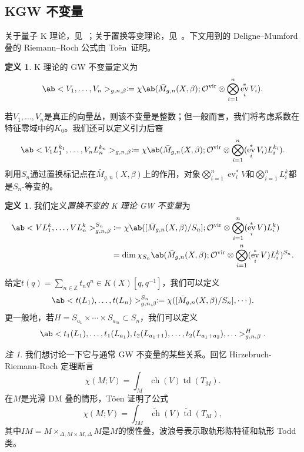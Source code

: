 \documentclass{amsart}
\theoremstyle{definition}
\newtheorem{defn}[thm]{定义}
\theoremstyle{remark}
\newtheorem{rmk}[thm]{注}
\theoremstyle{plain}
\theoremstyle{definition}
\theoremstyle{remark}
\newcommand{\Z}{\mathbb{Z}}
\newcommand{\mc}[1]{\mathcal{#1}}
\newcommand{\mr}[1]{\mathrm{#1}}
\newcommand{\on}[1]{\operatorname{#1}}
\newcommand{\wt}[1]{\widetilde{#1}}
\newcommand{\1}{\mathbf{1}}
\newcommand{\2}{\mathbf{2}}
\newcommand{\3}{\mathbf{3}}
\newcommand{\vir}{\mr{vir}}
\DeclareMathOperator{\ev}{ev}
\begin{document}
\subsection{KGW 不变量}%
\label{sub:KGW invariants}

关于量子 K 理论，见~\cite{Lee2004}；关于置换等变理论，见~\cite{Givental2017K1,GiventalK7}。下文用到的 Deligne--Mumford 叠的 Riemann--Roch 公式由 To\"en~\cite{Toen1999}证明。

\begin{defn}
    K 理论的 GW 不变量定义为
    \[ \ab<V_1, \ldots, V_n>_{g,n,\beta} \coloneqq \chi\ab(\bar{M}_{g,n}(X, \beta); \mc{O}^{\vir} \otimes \bigotimes_{i=1}^n \ev_i^* V_i). \]
\end{defn}

若\(V_1, \ldots, V_n\)是真正的向量丛，则该不变量是整数；但一般而言，我们将考虑系数在特征零域中的\(K_0\)。我们还可以定义引力后裔
\[ \ab<V_1 L_1^{k_1}, \ldots, V_n L_n^{k_n}>_{g,n,\beta} \coloneqq \chi\ab(\bar{M}_{g,n}(X, \beta); \mc{O}^{\vir} \otimes \bigotimes_{i=1}^n ( \ev_i^* V_i )L_i^{k_i} ). \]
利用\(S_n\)通过置换标记点在\(\bar{M}_{g,n}(X, \beta)\)上的作用，对象\(\bigotimes_{i=1}^n \ev_i^* V\)和\(\bigotimes_{i=1}^n L_i^k\)都是\(S_n\)-等变的。

\begin{defn}
    我们定义\textit{置换不变的 K 理论 GW 不变量}为
    \begin{align*}
        \ab<V L_1^k, \ldots, V L_n^k>_{g,n,\beta}^{S_n} &\coloneqq \chi\ab([ \bar{M}_{g,n}(X, \beta)/S_n ]; \mc{O}^{\vir} \otimes \bigotimes_{i=1}^n ( \ev_i^* V ) L_i^k) \\
        &= \dim \chi_{S_n} \ab(\bar{M}_{g,n}(X, \beta); \mc{O}^{\vir} \otimes \bigotimes_{i=1}^n ( \ev_i^* V ) L_i^k )^{S_n}.
    \end{align*}
\end{defn}

给定\(t(q) = \sum_{n \in \Z} t_n q^n \in K(X)[q,q^{-1}]\)，我们可以定义
\[ \ab< t(L_1), \ldots, t(L_n)>^{S_n}_{g,n,\beta} \coloneqq \chi ([\bar{M}_{g,n}(X,\beta)/S_n], \cdots). \]
更一般地，若\(H = S_{a_1} \times \cdots \times S_{a_m} \subset S_n\)，我们可以定义
\[ \ab<t_1(L_1), \ldots, t_1(L_{a_1}), t_2(L_{a_1+1}), \ldots, t_2(L_{a_1+a_2}), \ldots>_{g,n,\beta}^H. \]

\begin{rmk}
    我们想讨论一下它与通常 GW 不变量的某些关系。回忆 Hirzebruch-Riemann-Roch 定理断言
    \[ \chi(M; V) = \int_M \on{ch}(V) \on{td}(T_M). \]
    在\(M\)是光滑 DM 叠的情形，T\"oen 证明了公式
    \[ \chi(M; V) = \int_{IM} \wt{\on{ch}}(V) \wt{\on{td}}(T_M), \]
    其中\(IM = M \times_{\Delta, M \times M, \Delta} M\)是\(M\)的惯性叠，波浪号表示取轨形陈特征和轨形 Todd 类。
\end{rmk}
\end{document}
